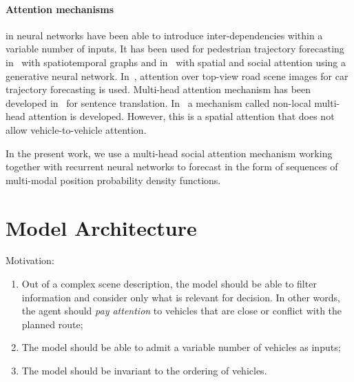 \documentclass{article}
\begin{document}
{\paragraph{Attention mechanisms} {in neural networks have been able to introduce inter-dependencies within a variable number of inputs.
It has been used for pedestrian trajectory forecasting in~\cite{Vemula2018} with spatiotemporal graphs and
in~\cite{Sadeghian2019CVPR} with spatial and social attention using a generative neural network.
In~\cite{Sadeghian2018ECCV}, attention over top-view road scene images for car trajectory forecasting is used.
Multi-head attention mechanism has been developed in~\cite{Vaswani2017} for sentence translation.
In~\cite{Messaoud2019} a mechanism called non-local multi-head attention is developed.
However, this is a spatial attention that does not allow vehicle-to-vehicle attention.

In the present work, we use a multi-head social attention mechanism working together with
recurrent neural networks to forecast in the form of sequences of multi-modal position probability density
functions.}

\section{Model Architecture}

Motivation: 
\begin{enumerate}
	\item Out of a complex scene description, the model should be able to filter information and consider only what is relevant for decision. In other words, the agent should \emph{pay attention} to vehicles that are close or conflict with the planned route;
	\item The model should be able to admit a variable number of vehicles as inputs;
	\item The model should be invariant to the ordering of vehicles.
\end{enumerate}


\begin{figure}[ht]
	\centering
\end{figure}}
\end{document}
